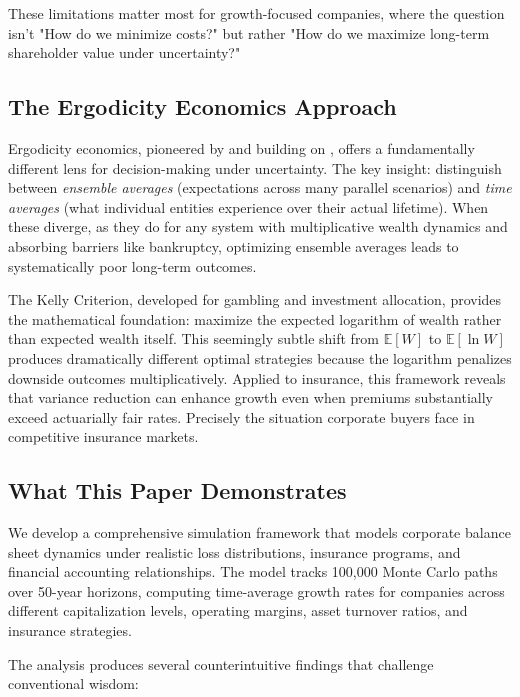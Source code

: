 \documentclass[11pt,letterpaper]{article}
\begin{document}
These limitations matter most for growth-focused companies, where the question isn't "How do we minimize costs?" but rather "How do we maximize long-term shareholder value under uncertainty?"

\subsection{The Ergodicity Economics Approach}

Ergodicity economics, pioneered by \citet{peters2019ergodicity} and building on \citet{kelly1956new}, offers a fundamentally different lens for decision-making under uncertainty. The key insight: distinguish between \emph{ensemble averages} (expectations across many parallel scenarios) and \emph{time averages} (what individual entities experience over their actual lifetime). When these diverge, as they do for any system with multiplicative wealth dynamics and absorbing barriers like bankruptcy, optimizing ensemble averages leads to systematically poor long-term outcomes.

The Kelly Criterion, developed for gambling and investment allocation, provides the mathematical foundation: maximize the expected logarithm of wealth rather than expected wealth itself. This seemingly subtle shift from $\mathbb{E}[W]$ to $\mathbb{E}[\ln W]$ produces dramatically different optimal strategies because the logarithm penalizes downside outcomes multiplicatively. Applied to insurance, this framework reveals that variance reduction can enhance growth even when premiums substantially exceed actuarially fair rates. Precisely the situation corporate buyers face in competitive insurance markets.

\subsection{What This Paper Demonstrates}

We develop a comprehensive simulation framework that models corporate balance sheet dynamics under realistic loss distributions, insurance programs, and financial accounting relationships. The model tracks 100,000 Monte Carlo paths over 50-year horizons, computing time-average growth rates for companies across different capitalization levels, operating margins, asset turnover ratios, and insurance strategies.

The analysis produces several counterintuitive findings that challenge conventional wisdom:
\end{document}
